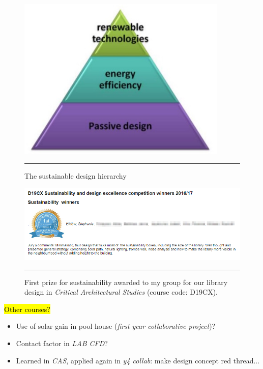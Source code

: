 \begin{figure}[htbp]
	\centering
	\includegraphics[width=10cm]{figures/Hierarchy.jpg}
	\rule{\textwidth}{0.5pt} %
	\caption{The sustainable design hierarchy %
	}
	\label{fig_hierarchy}
\end{figure}


\begin{figure}[htbp]
	\centering
	\includegraphics[width=\textwidth]{figures/SustainabilityAward.png}
	\rule{\textwidth}{0.5pt} %
	\caption{First prize for sustainability awarded to my group for our library design in \textit{Critical Architectural Studies} (course code: D19CX).}
	\label{fig_award}
\end{figure}

\hl{Other courses?}
\begin{itemize}
	\item Use of solar gain in pool house (\textit{first year collaborative project})?
	\item Contact factor in \textit{LAB CFD}?
	\item Learned in \textit{CAS}, applied again in \textit{y4 collab}: make design concept red thread...
\end{itemize}



